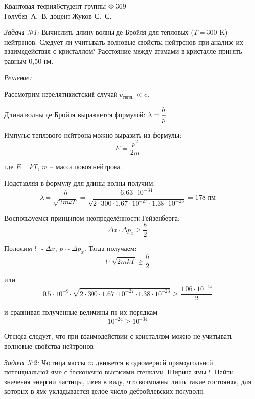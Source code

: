 



\usepackage{wrapfig}


{Квантовая теория}{}{6}{студент группы Ф-369\\Голубев~А.~В.}
{}{доцент Жуков~С.~С.}{}{}


\emph{Задача №1:} Вычислить длину волны де Бройля для тепловых 
(\( T = 300 \) K) нейтронов. Следует ли учитывать волновые свойства нейтронов 
при анализе их взаимодействия с кристаллом? Расстояние между атомами в 
кристалле принять равным 0,50 нм.

\emph{Решение:}

Рассмотрим нерелятивистский случай \( v_\text{тепл.} \ll c \).

Длина волны де Бройля выражается формулой: \( \lambda = \cfrac{h}{p} \)

Импульс теплового нейтрона можно выразить из формулы: 
\[	
	E = \frac{p^2}{2m}
\] 

где \( E = kT \), \( m \) -- масса покоя нейтрона.

Подставляя в формулу для длины волны получим:
\[
	\lambda = \frac{h}{\sqrt{2mkT}} = 
	\frac{6.63\cdot10^{-34}}
	{\sqrt{2\cdot300\cdot1.67\cdot10^{-27}\cdot1.38\cdot10^{-23}}} =
	178 \text{ пм}
\]

Воспользуемся принципом неопределённости Гейзенберга:
\[
	\Delta x \cdot \Delta p_x \geq \frac{\hbar}{2}
\]

Положим \( l \sim \Delta x \), \( p \sim \Delta p_x \). Тогда получаем:
\[
	l\cdot \sqrt{2mkT} \geq \frac{\hbar}{2} 
\]

или
\[ 
	0.5\cdot10^{-9} \cdot 
	\sqrt{2\cdot300\cdot1.67\cdot10^{-27}\cdot1.38\cdot10^{-23}} \geq
	\frac{1.06\cdot10^{-34}}{2}
\]

и сравнивая полученные величины по их порядкам
\[
	10^{-24} \geq 10^{-34}
\]

Отсюда следует, что при взаимодействии с кристаллом можно не учитывать волновые 
свойства нейтронов.

\pagebreak

\emph{Задача №2:} Частица массы \( m \) движется в одномерной прямоугольной 
потенциальной яме с бесконечно высокими стенками. Ширина ямы \( l \). Найти 
значения энергии частицы, имея в виду, что возможны лишь такие состояния, для 
которых в яме укладывается целое число дебройлевских полуволн. 

